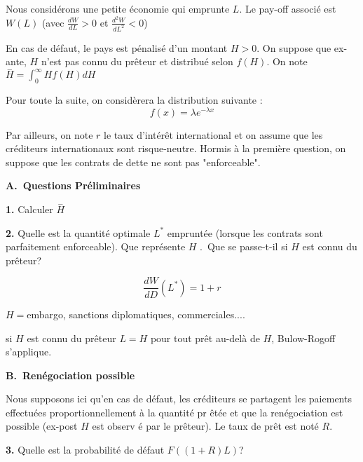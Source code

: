 \documentclass[a4paper]{article}
\begin{document}
Nous consid\'{e}rons une petite \'{e}conomie qui emprunte $L$. Le pay-off
associ\'{e} est $W(L)$ (avec $\frac{dW}{dL}>0$ et $\frac{d^{2}W}{dL^{2}}<0$)

En cas de d\'{e}faut, le pays est p\'{e}nalis\'{e} d'un montant $H>0$. On
suppose que ex-ante, $H$ n'est pas connu du pr\^{e}teur et distribu\'{e}
selon $f(H)$. On note $\overset{-}{H}=\int_{0}^{\infty }Hf(H)dH$

Pour toute la suite, on consid\`{e}rera la distribution suivante :%
\begin{equation*}
f(x)=\lambda e^{-\lambda x}
\end{equation*}

Par ailleurs, on note $r$ le taux d'int\'{e}r\^{e}t international et on
assume que les cr\'{e}diteurs internationaux sont risque-neutre. Hormis \`{a}
la premi\`{e}re question, on suppose que les contrats de dette ne sont pas
"enforceable".

\bigskip

\textbf{A.\ Questions Pr\'{e}liminaires}

\textbf{1. }Calculer $\overset{-}{H}$

\textbf{2. }Quelle est la quantit\'{e} optimale $L^{\ast }$ emprunt\'{e}e
(lorsque les contrats sont parfaitement enforceable). Que repr\'{e}sente $H$%
.\ Que se passe-t-il si $H$ est connu du pr\^{e}teur?

\bigskip

\begin{equation*}
\frac{dW}{dD}(L^{\ast })=1+r
\end{equation*}

$H=$embargo, sanctions diplomatiques, commerciales....

si $H$ est connu du pr\^{e}teur $L=H$ pour tout pr\^{e}t au-del\`{a} de $H$,
Bulow-Rogoff s'applique.

\bigskip

\textbf{B.\ Ren\'{e}gociation possible}

\bigskip

Nous supposons ici qu'en cas de d\'{e}faut, les cr\'{e}diteurs se partagent
les paiements effectu\'{e}es proportionnellement \`{a} la quantit\'{e} pr%
\^{e}t\'{e}e et que la ren\'{e}gociation est possible (ex-post $H$ est observ%
\'{e} par le pr\^{e}teur). Le taux de pr\^{e}t est not\'{e} $R$.

\bigskip

\textbf{3. }Quelle est la probabilit\'{e} de d\'{e}faut $F((1+R)L)$?

\bigskip
\end{document}
